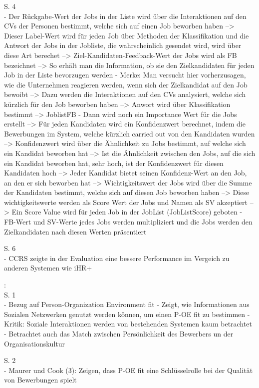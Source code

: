 S. 4\\
- Der Rückgabe-Wert der Jobs in der Liste wird über die Interaktionen auf den CVs der Personen bestimmt, welche sich auf einen Job beworben haben --> Dieser Label-Wert wird für jeden Job über Methoden der Klassifikation und die Antwort der Jobs in der Jobliste, die wahrscheinlich gesendet wird, wird über diese Art berechet --> Ziel-Kandidaten-Feedback-Wert der Jobs wird als FB bezeichnet --> So erhält man die Information, ob sie den Zielkandidaten für jeden Job in der Liste bevorzugen werden
- Merke: Man versucht hier vorherzusagen, wie die Unternehmen reagieren werden, wenn sich der Zielkandidat auf den Job bewoibt --> Dazu werden die Interaktionen auf den CVs analysiert, welche sich kürzlich für den Job beworben haben --> Anwort wird über Klassifikation bestimmt --> JoblistFB
- Dann wird noch ein Importance Wert für die Jobs erstellt --> Für jeden Kandidaten wird ein Konfidenzwert berechnet, indem die Bewerbungen im System, welche kürzlich carried out von den Kandidaten wurden --> Konfidenzwert wird über die Ähnlichkeit zu Jobs bestimmt, auf welche sich ein Kandidat beworben hat --> Ist die Ähnlichkeit zwischen den Jobs, auf die sich ein Kandidat beworben hat, sehr hoch, ist der Konfidenzwert für diesen Kandidaten hoch --> Jeder Kandidat bietet seinen Konfidenz-Wert an den Job, an den er sich beworben hat --> Wichtigkeitswert der Jobs wird über die Summe der Kandidaten bestimmt, welche sich auf diesen Job beworben haben --> Diese wichtigkeitswerte werden als Score Wert der Jobs und Namen als SV akzeptiert --> Ein Score Value wird für jeden Job in der JobList (JobListScore) geboten
- FB-Wert und SV-Werte jedes Jobs werden multipliziert und die Jobs werden den Zielkandidaten nach diesen Werten präsentiert

S. 6\\
- CCRS zeigte in der Evaluation eine bessere Performance im Vergeich zu anderen Systemen wie iHR+

\textcite{buettner:2014}:\\
S. 1\\
- Bezug auf Person-Organization Environment fit
- Zeigt, wie Informationen aus Sozialen Netzwerken genutzt werden können, um einen P-OE fit zu bestimmen
- Kritik: Soziale Interaktionen werden von bestehenden Systemen kaum betrachtet
- Betrachtet auch das Match zwischen Persönlichkeit des Bewerbers un der Organisationskultur

S. 2\\
- Maurer und Cook (3): Zeigen, dass P-OE fit eine Schlüsselrolle bei der Qualität von Bewerbungen spielt

